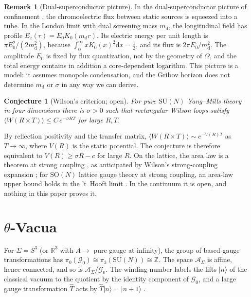 \documentclass[11pt,a4paper]{amsart}
\newtheorem{conjecture}[theorem]{Conjecture}
\theoremstyle{definition}
\newtheorem{remark}[theorem]{Remark}
\newcommand{\R}{\mathbb{R}}
\newcommand{\Z}{\mathbb{Z}}
\newcommand{\cA}{\mathcal{A}}
\newcommand{\cG}{\mathcal{G}}
\newcommand{\diff}{\mathrm{d}}
\begin{document}
\begin{remark}[Dual-superconductor picture]
\label{rem:dual}
In the dual-superconductor picture of confinement \cite{nambu1974strings, mandelstam1976vortices, thooft1981topology}, the chromoelectric flux between static sources is squeezed into a tube. In the London limit with dual screening mass $m_{\mathrm{d}}$, the longitudinal field has profile $E_z(r) = E_0K_0(m_{\mathrm{d}}r)$. Its electric energy per unit length is $\pi E_0^2/(2m_{\mathrm{d}}^2)$, because $\int_0^\infty xK_0(x)^2\diff x = \frac12$, and its flux is $2\pi E_0/m_{\mathrm{d}}^2$. The amplitude $E_0$ is fixed by flux quantization, not by the geometry of $\Omega$, and the total energy contains in addition a core-dependent logarithm. This picture is a model: it assumes monopole condensation, and the Gribov horizon does not determine $m_{\mathrm{d}}$ or $\sigma$ in any way we can derive.
\end{remark}

\begin{conjecture}[Wilson's criterion; open]
\label{conj:area_law}
For pure $\mathrm{SU}(N)$ Yang--Mills theory in four dimensions there is $\sigma > 0$ such that rectangular Wilson loops satisfy $\langle W(R\times T)\rangle \le C\,e^{-\sigma RT}$ for large $R, T$.
\end{conjecture}

By reflection positivity and the transfer matrix, $\langle W(R\times T)\rangle \sim e^{-V(R)T}$ as $T\to\infty$, where $V(R)$ is the static potential. The conjecture is therefore equivalent to $V(R) \ge \sigma R - c$ for large $R$. On the lattice, the area law is a theorem at strong coupling \cite{osterwalder1978gauge}, as anticipated by Wilson's strong-coupling expansion \cite{wilson1974confinement}; for $\mathrm{SO}(N)$ lattice gauge theory at strong coupling, an area-law upper bound holds in the 't~Hooft limit \cite{chatterjee2019rigorous}. In the continuum it is open, and nothing in this paper proves it.

\section{\texorpdfstring{$\theta$}{Theta}-Vacua}

For $\Sigma = S^3$ (or $\R^3$ with $A \to$ pure gauge at infinity), the group of based gauge transformations has $\pi_0(\cG_0) \cong \pi_3(\mathrm{SU}(N)) \cong \Z$. The space $\cA_\Sigma$ is affine, hence connected, and so is $\cA_\Sigma/\cG_0$. The winding number labels the lifts $|n\rangle$ of the classical vacuum to the quotient by the identity component of $\cG_0$, and a large gauge transformation $\hat T$ acts by $\hat T|n\rangle = |n+1\rangle$ \cite{callan1976structure, jackiw1976vacuum}.
\end{document}

